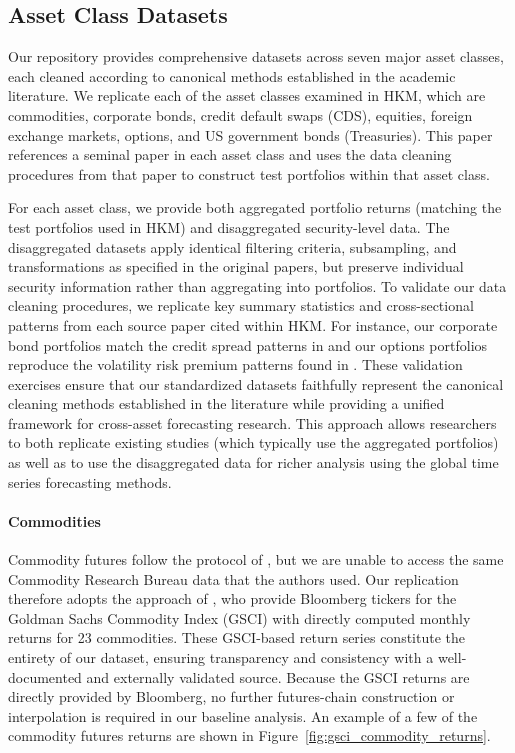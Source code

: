 \documentclass{article}
\begin{document}

\subsection{Asset Class Datasets}
Our repository provides comprehensive datasets across seven major asset classes, each cleaned according to canonical methods established in the academic literature. We replicate each of the asset classes examined in HKM, which are commodities, corporate bonds, credit default swaps (CDS), equities, foreign exchange markets, options, and US government bonds (Treasuries). 
This paper references a seminal paper in each asset class 
and uses the data cleaning procedures from that paper to construct test portfolios within that asset class.

For each asset class, we provide both aggregated portfolio returns (matching the test portfolios used in HKM) and disaggregated security-level data. The disaggregated datasets apply identical filtering criteria, subsampling, and transformations as specified in the original papers, but preserve individual security information rather than aggregating into portfolios. 
To validate our data cleaning procedures, we replicate key summary statistics and cross-sectional patterns from each source paper cited within HKM. For instance, our corporate bond portfolios match the credit spread patterns in \cite{Nozawa2017} and our options portfolios reproduce the volatility risk premium patterns found in \cite{Constantinides2013}. These validation exercises ensure that our standardized datasets faithfully represent the canonical cleaning methods established in the literature while providing a unified framework for cross-asset forecasting research. This approach allows researchers to both replicate existing studies (which typically use the aggregated portfolios) as well as to use the disaggregated data for richer analysis using the global time
series forecasting methods.



\paragraph{Commodities}
Commodity futures follow the protocol of \cite{Yang2013}, but we are unable
to access the same Commodity Research Bureau data that the authors used.
Our replication therefore adopts the approach of
\cite{Koijen2018}, who provide Bloomberg tickers for the Goldman Sachs
Commodity Index (GSCI) with directly computed monthly returns for 23 commodities.
These GSCI-based return series constitute the entirety of our dataset, ensuring
transparency and consistency with a well-documented and externally validated
source. Because the GSCI returns are directly provided by Bloomberg, no further
futures-chain construction or interpolation is required in our baseline analysis.
An example of a few of the commodity futures returns are shown in Figure~\ref{fig:gsci_commodity_returns}.
\end{document}
